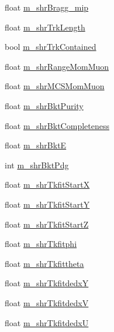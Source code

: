 \begin{DoxyCompactItemize}
\item 
float \hyperlink{classselection_1_1CCincSelection_a0d588b58345d52cc13a398bb3f6ff2fd}{m\+\_\+shr\+Bragg\+\_\+mip}
\item 
float \hyperlink{classselection_1_1CCincSelection_a09db29c4170084b4c366defeb3330de8}{m\+\_\+shr\+Trk\+Length}
\item 
bool \hyperlink{classselection_1_1CCincSelection_a5cde5d5c0d798594d11f082dadaf52bc}{m\+\_\+shr\+Trk\+Contained}
\item 
float \hyperlink{classselection_1_1CCincSelection_a5dff6f4a03bc26649697adbd38241be3}{m\+\_\+shr\+Range\+Mom\+Muon}
\item 
float \hyperlink{classselection_1_1CCincSelection_a752b664543c799d4afd1ee195091ff1c}{m\+\_\+shr\+M\+C\+S\+Mom\+Muon}
\item 
float \hyperlink{classselection_1_1CCincSelection_a95079e8ae0cb7d55594d64812d24327c}{m\+\_\+shr\+Bkt\+Purity}
\item 
float \hyperlink{classselection_1_1CCincSelection_ae50845633aef1725ac8c894101041f54}{m\+\_\+shr\+Bkt\+Completeness}
\item 
float \hyperlink{classselection_1_1CCincSelection_a0a43f7b976987cc6d13389a589c561e2}{m\+\_\+shr\+BktE}
\item 
int \hyperlink{classselection_1_1CCincSelection_aa11fee829a174ef4b6f92041edb990cf}{m\+\_\+shr\+Bkt\+Pdg}
\item 
float \hyperlink{classselection_1_1CCincSelection_a0bab1ed8cdf12861136bd47a6d48c7ad}{m\+\_\+shr\+Tkfit\+StartX}
\item 
float \hyperlink{classselection_1_1CCincSelection_aeff05af138a16a516e5413e21b6bcdf1}{m\+\_\+shr\+Tkfit\+StartY}
\item 
float \hyperlink{classselection_1_1CCincSelection_a9c1c8138a2febe952478d15845ca8846}{m\+\_\+shr\+Tkfit\+StartZ}
\item 
float \hyperlink{classselection_1_1CCincSelection_af760bcbc586c53183f9ed2d5359b028a}{m\+\_\+shr\+Tkfitphi}
\item 
float \hyperlink{classselection_1_1CCincSelection_a9fa1d825a900a4081323091daa9b0aa7}{m\+\_\+shr\+Tkfittheta}
\item 
float \hyperlink{classselection_1_1CCincSelection_aa619cb73a3bb42251eaf5b35445e788b}{m\+\_\+shr\+TkfitdedxY}
\item 
float \hyperlink{classselection_1_1CCincSelection_afd1502883efc2504917a3b17eeb4aa46}{m\+\_\+shr\+TkfitdedxV}
\item 
float \hyperlink{classselection_1_1CCincSelection_aaa3a14c43d0e840fa3032a46bd498db1}{m\+\_\+shr\+TkfitdedxU}

\end{DoxyCompactItemize}
